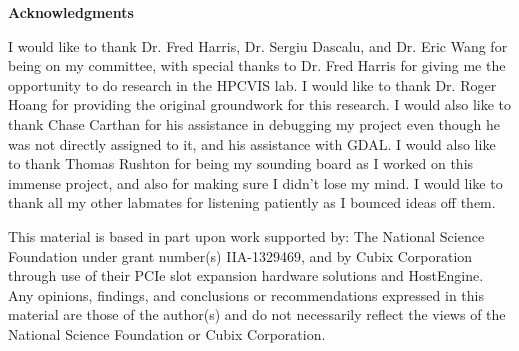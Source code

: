 \newpage
{}
\begin{center}
  \bf {Acknowledgments}
\end{center}

I would like to thank Dr. Fred Harris, Dr. Sergiu Dascalu, and Dr. Eric Wang for being on my committee, with special thanks to Dr. Fred Harris for giving me the opportunity to do research in the HPCVIS lab. I would like to thank Dr. Roger Hoang for providing the original groundwork for this research. I would also like to thank Chase Carthan for his assistance in debugging my project even though he was not directly assigned to it, and his assistance with GDAL. I would also like to thank Thomas Rushton for being my sounding board as I worked on this immense project, and also for making sure I didn't lose my mind. I would like to thank all my other labmates for listening patiently as I bounced ideas off them. 

This material is based in part upon work supported by: The National Science Foundation under grant number(s) IIA-1329469, and by Cubix Corporation through use of their PCIe slot expansion hardware solutions and HostEngine. Any opinions, findings, and conclusions or recommendations expressed in this material are those of the author(s) and do not necessarily reflect the views of the National Science Foundation or Cubix Corporation.